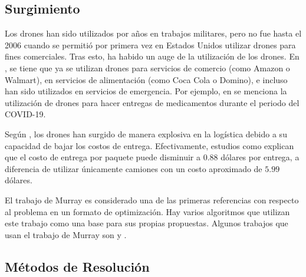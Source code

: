 
\subsection{Surgimiento}

Los drones han sido utilizados por años en trabajos militares, pero no fue hasta el 2006 cuando se permitió por primera vez en Estados Unidos utilizar drones para fines comerciales. Tras esto, ha habido un auge de la utilización de los drones. En \cite{moshrefjavadi2021applications}, se tiene que ya se utilizan drones para servicios de comercio (como Amazon o Walmart), en servicios de alimentación (como Coca Cola o Domino), e incluso han sido utilizados en servicios de emergencia. Por ejemplo, en \cite{stell2022drone} se menciona la utilización de drones para hacer entregas de medicamentos durante el periodo del COVID-19.

Según \cite{transinfo_drones}, los drones han surgido de manera explosiva en la logística debido a su capacidad de bajar los costos de entrega. Efectivamente, estudios como \cite{moshrefjavadi2021applications} explican que el costo de entrega por paquete puede disminuir a $0.88$ dólares por entrega, a diferencia de utilizar únicamente camiones con un costo aproximado de $5.99$ dólares.

El trabajo de Murray \cite{Murray2015Flying} es considerado una de las primeras referencias con respecto al problema en un formato de optimización. Hay varios algoritmos que utilizan este trabajo como una base para sus propias propuestas. Algunos trabajos que usan el trabajo de Murray son \cite{ponza2016optimization} y \cite{freitas2021exact}.

\subsection{Métodos de Resolución}

